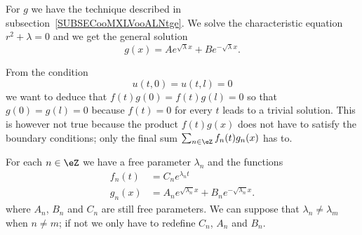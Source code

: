 For \( g\) we have the technique described in subsection~\ref{SUBSECooMXLVooALNtge}. We solve the characteristic equation $r^2+\lambda=0$ and we get the general solution
\begin{equation}
	g(x)=A e^{\sqrt{ \lambda }x}+B e^{-\sqrt{ \lambda }x}.
\end{equation}

From the condition
\begin{equation}
	u(t,0)=u(t,l)=0
\end{equation}
we want to deduce that \( f(t)g(0)=f(t)g(l)=0\) so that \( g(0)=g(l)=0\) because \( f(t)=0\) for every \( t\) leads to a trivial solution. This is however not true because the product \( f(t)g(x)\) does not have to satisfy the boundary conditions; only the final sum \( \sum_{n\in \eZ}f_n(t)g_n(x)\) has to.

For each \( n\in \eZ\) we have a free parameter \( \lambda_n\) and the functions
\begin{subequations}
	\begin{align}
		f_n(t) & =C_n e^{\lambda_n t}                                       \\
		g_n(x) & =A_n e^{\sqrt{ \lambda_n }x}+B_n e^{-\sqrt{ \lambda_n }x}.
	\end{align}
\end{subequations}
where \( A_n\), \( B_n\) and \( C_n\) are still free parameters. We can suppose that \( \lambda_n\neq \lambda_m\) when \( n\neq m\); if not we only have to redefine \( C_n\), \( A_n\) and \( B_n\).

